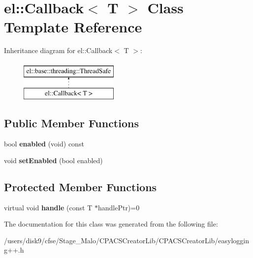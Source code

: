 \hypertarget{classel_1_1Callback}{\section{el\-:\-:Callback$<$ T $>$ Class Template Reference}
\label{classel_1_1Callback}
}
Inheritance diagram for el\-:\-:Callback$<$ T $>$\-:\begin{figure}[H]
\begin{center}
\leavevmode
\includegraphics[height=2.000000cm]{classel_1_1Callback}
\end{center}
\end{figure}
\subsection*{Public Member Functions}
\begin{DoxyCompactItemize}
\item 
\hypertarget{classel_1_1Callback_a1e3089fd19a11965e7b98bd423116bbd}{bool {\bfseries enabled} (void) const }\label{classel_1_1Callback_a1e3089fd19a11965e7b98bd423116bbd}

\item 
\hypertarget{classel_1_1Callback_a05e68cb0b5ea4423913fa2ec4ea306b4}{void {\bfseries set\-Enabled} (bool enabled)}\label{classel_1_1Callback_a05e68cb0b5ea4423913fa2ec4ea306b4}

\end{DoxyCompactItemize}
\subsection*{Protected Member Functions}
\begin{DoxyCompactItemize}
\item 
\hypertarget{classel_1_1Callback_a8997c7971d65062c374ef24e653061be}{virtual void {\bfseries handle} (const T $\ast$handle\-Ptr)=0}\label{classel_1_1Callback_a8997c7971d65062c374ef24e653061be}

\end{DoxyCompactItemize}


The documentation for this class was generated from the following file\-:\begin{DoxyCompactItemize}
\item 
/users/disk9/cfse/\-Stage\-\_\-\-Malo/\-C\-P\-A\-C\-S\-Creator\-Lib/\-C\-P\-A\-C\-S\-Creator\-Lib/easylogging++.\-h\end{DoxyCompactItemize}
